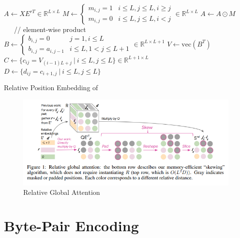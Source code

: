 \documentclass[11pt]{article}
\theoremstyle{definition}
\begin{document}
\begin{algorithm}
\SetNoFillComment
{} 
$A \leftarrow XE^{rT} \in \mathbb{R}^{L \times L}$\;
$M \leftarrow \begin{cases} m_{i,j} = 1 & i \leq L, j \leq L, i \geq j \\ m_{i,j} = 0 & i \leq L, j \leq L, i < j \end{cases} \in \mathbb{R}^{L \times L}$\;
$A \leftarrow A \odot M$ \ \ \ // element-wise product\;
$B \leftarrow \begin{cases} b_{i,j} = 0 & j=1, i \leq L \\ b_{i,j} = a_{i,j-1} & i \leq L, 1 < j \leq L+1 \end{cases} \in \mathbb{R}^{L \times L+1}$\;
$V \leftarrow \mathrm{vec} (B^T)$\;
$C \leftarrow \{c_{ij} = V_{(i-1)L + j} \ | \ i \leq L, j \leq L \} \in \mathbb{R}^{L+1 \times L}$\;
$D \leftarrow \{d_{ij} = c_{i+1,j} \ | \ i \leq L, j \leq L\}$\;
\;
\caption{Relative Position Embedding of \cite{huang2018music}}\label{rel-pos-emb}
\end{algorithm}

\begin{figure}
\centering
  \includegraphics[width=\textwidth,height=\textheight,keepaspectratio]{transformers/relative_global_attention.png}
  \caption{Relative Global Attention \cite{huang2018music}}
  \label{fig:relative_global_attention}
\end{figure}


\section{Byte-Pair Encoding} \label{BPE}
\end{document}
